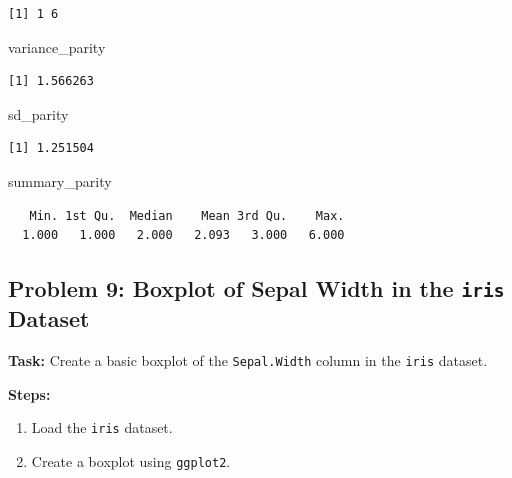 \documentclass[
  letterpaper,
  DIV=11,
  numbers=noendperiod]{scrreprt}
\newenvironment{Shaded}{\begin{snugshade}}{\end{snugshade}}
\newcommand{\NormalTok}[1]{\textcolor[rgb]{0.00,0.23,0.31}{#1}}
\providecommand{\tightlist}{%
  \setlength{\itemsep}{0pt}\setlength{\parskip}{0pt}}\usepackage{longtable,booktabs,array}
\begin{document}
\begin{verbatim}
[1] 1 6
\end{verbatim}

\begin{Shaded}
\begin{Highlighting}[]
\NormalTok{variance\_parity}
\end{Highlighting}
\end{Shaded}

\begin{verbatim}
[1] 1.566263
\end{verbatim}

\begin{Shaded}
\begin{Highlighting}[]
\NormalTok{sd\_parity}
\end{Highlighting}
\end{Shaded}

\begin{verbatim}
[1] 1.251504
\end{verbatim}

\begin{Shaded}
\begin{Highlighting}[]
\NormalTok{summary\_parity}
\end{Highlighting}
\end{Shaded}

\begin{verbatim}
   Min. 1st Qu.  Median    Mean 3rd Qu.    Max. 
  1.000   1.000   2.000   2.093   3.000   6.000 
\end{verbatim}

\subsection*{\texorpdfstring{Problem 9: Boxplot of Sepal Width in the
\texttt{iris}
Dataset}{Problem 9: Boxplot of Sepal Width in the iris Dataset}}\label{problem-9-boxplot-of-sepal-width-in-the-iris-dataset}

\textbf{Task:} Create a basic boxplot of the \texttt{Sepal.Width} column
in the \texttt{iris} dataset.

\textbf{Steps:}

\begin{enumerate}
\def\labelenumi{\arabic{enumi}.}
\tightlist
\item
  Load the \texttt{iris} dataset.
\item
  Create a boxplot using \texttt{ggplot2}.
\end{enumerate}
\end{document}
